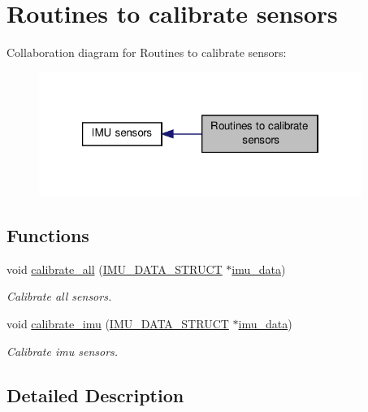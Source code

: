 \hypertarget{group__calibrate}{\section{Routines to calibrate sensors}
\label{group__calibrate}
}
Collaboration diagram for Routines to calibrate sensors\-:\nopagebreak
\begin{figure}[H]
\begin{center}
\leavevmode
\includegraphics[width=298pt]{group__calibrate}
\end{center}
\end{figure}
\subsection*{Functions}
\begin{DoxyCompactItemize}
\item 
void \hyperlink{group__calibrate_ga043045246cf217758281222214c4addc}{calibrate\-\_\-all} (\hyperlink{structIMU__DATA__STRUCT}{I\-M\-U\-\_\-\-D\-A\-T\-A\-\_\-\-S\-T\-R\-U\-C\-T} $\ast$\hyperlink{threads__linux_8c_a3cfea12cbe9ca7f1681c950e4cd68606}{imu\-\_\-data})
\begin{DoxyCompactList}\small\item\em Calibrate all sensors. \end{DoxyCompactList}\item 
void \hyperlink{group__calibrate_gaecfc81d152db2843b5d1517729804d63}{calibrate\-\_\-imu} (\hyperlink{structIMU__DATA__STRUCT}{I\-M\-U\-\_\-\-D\-A\-T\-A\-\_\-\-S\-T\-R\-U\-C\-T} $\ast$\hyperlink{threads__linux_8c_a3cfea12cbe9ca7f1681c950e4cd68606}{imu\-\_\-data})
\begin{DoxyCompactList}\small\item\em Calibrate imu sensors. \end{DoxyCompactList}\end{DoxyCompactItemize}


\subsection{Detailed Description}


